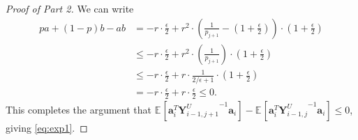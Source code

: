 \documentclass{toc}
\newcommand{\bv}[1]{\mathbf{#1}}
\newcommand{\expct}[3]{\mathbb{E}_{{#1}_{#2}}\left[#3\right]}
\begin{document}
\begin{proof}[Proof of  Part 2]
We can write %
%
%
%
\begin{align*}
pa + (1-p)b - ab  %
&= -r \cdot \frac{ \epsilon}{2}  + r^2 \cdot \left (\frac{1}{p_{j+1}} - \left (1+\frac{\epsilon}{2}\right)\right )\cdot \left (1+\frac{\epsilon}{2}\right)\\
 & \le  -r \cdot \frac{\epsilon}{2} + r^2 \cdot \left (\frac{1}{p_{j+1}}\right ) \cdot \left (1+\frac{\epsilon}{2}\right)\\
 & \le  -r \cdot \frac{\epsilon}{2} + r \cdot \frac{1}{2/\epsilon+1} \cdot \left (1+\frac{\epsilon}{2}\right)\\
  & =  -r \cdot \frac{\epsilon}{2} + r \cdot \frac{\epsilon}{2} \le 0.
\end{align*}
This completes the argument that $\expct{}{}{\bv{a}_i^T {\bv{Y}^U_{i-1,j+1}}^{-1} \bv{a}_i} - \expct{}{}{\bv{a}_i^T {\bv{Y}^U_{i-1,j}}^{-1}  \bv{a}_i} \le 0$, giving \eqref{eq:exp1}.


\smallskip


\end{proof}
\end{document}

